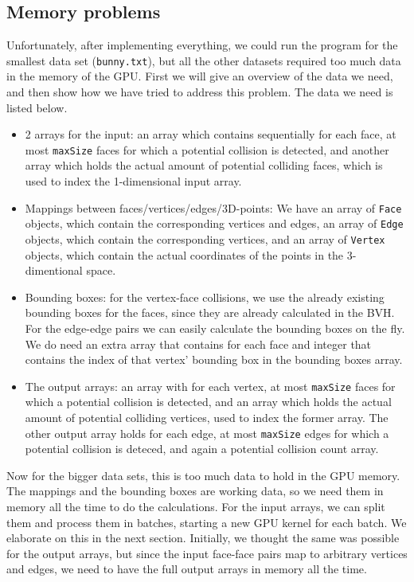 \subsection{Memory problems}
\label{subsec:memory}
Unfortunately, after implementing everything, we could run the program for the smallest data set (\texttt{bunny.txt}), but all the other datasets required too much data in the memory of the GPU. First we will give an overview of the data we need, and then show how we have tried to address this problem. The data we need is listed below.

\begin{itemize}
	\item 2 arrays for the input: an array which contains sequentially for each face, at most \texttt{maxSize} faces for which a potential collision is detected, and another array which holds the actual amount of potential colliding faces, which is used to index the 1-dimensional input array.
	\item Mappings between faces/vertices/edges/3D-points: We have an array of \texttt{Face} objects, which contain the corresponding vertices and edges, an array of \texttt{Edge} objects, which contain the corresponding vertices, and an array of \texttt{Vertex} objects, which contain the actual coordinates of the points in the 3-dimentional space.
	\item Bounding boxes: for the vertex-face collisions, we use the already existing bounding boxes for the faces, since they are already calculated in the BVH. For the edge-edge pairs we can easily calculate the bounding boxes on the fly. We do need an extra array that contains for each face and integer that contains the index of that vertex' bounding box in the bounding boxes array.
	\item The output arrays: an array with for each vertex, at most \texttt{maxSize} faces for which a potential collision is detected, and an array which holds the actual amount of potential colliding vertices, used to index the former array. The other output array holds for each edge, at most \texttt{maxSize} edges for which a potential collision is deteced, and again a potential collision count array.
\end{itemize}

Now for the bigger data sets, this is too much data to hold in the GPU memory. The mappings and the bounding boxes are working data, so we need them in memory all the time to do the calculations. For the input arrays, we can split them and process them in batches, starting a new GPU kernel for each batch. We elaborate on this in the next section. Initially, we thought the same was possible for the output arrays, but since the input face-face pairs map to arbitrary vertices and edges, we need to have the full output arrays in memory all the time.\\


